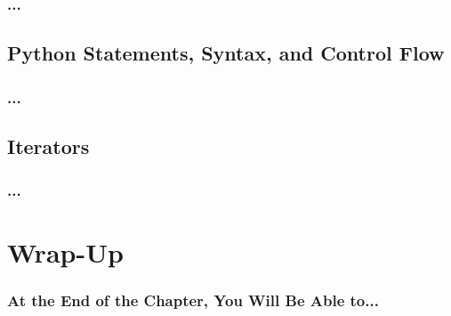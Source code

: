 \documentclass[aspectratio=1610]{beamer}
\begin{document}
\begin{frame}
    \frametitle{...}
\end{frame}

\subsection{Python Statements, Syntax, and Control Flow}

\begin{frame}
    \frametitle{...}
\end{frame}

\subsection{Iterators }

\begin{frame}
    \frametitle{...}
\end{frame}

\section{Wrap-Up}

\begin{frame}
    \frametitle{At the End of the Chapter, You Will Be Able to...}
\end{frame}
\end{document}
